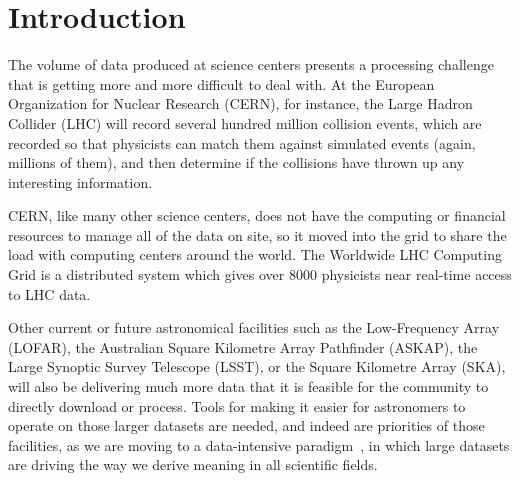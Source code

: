 \chapter{Introduction}


The volume of data produced at
science centers presents a
processing challenge
that is getting more and more difficult to deal with.
At the European Organization for Nuclear Research
(CERN), for instance,
the Large Hadron Collider (LHC) will record
several hundred million collision events,
which are recorded so that physicists can match them against simulated events (again, millions of them), and then determine if the collisions have thrown up any interesting information.

CERN, like many other science centers, does not have the computing or financial resources to manage all of the data
on site,
so it moved into the grid to share the load with computing centers around the world. The Worldwide LHC Computing Grid is a distributed system which gives over 8000 physicists near real-time access to LHC data.

Other current or future astronomical  facilities such as the Low-Frequency Array (LOFAR), the Australian Square Kilometre Array Pathfinder (ASKAP), the Large Synoptic Survey Telescope (LSST), or the Square Kilometre Array (SKA), will also be delivering much more data that it is feasible for the community to directly download or process. Tools for making
it
easier for astronomers to operate on those larger datasets are needed, and indeed are priorities of those
facilities, as we are moving to a data-intensive paradigm~\cite{Micro_01}, in which large datasets are driving the way we derive meaning in all scientific fields.


